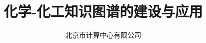 
\title{化学-化工知识图谱的建设与应用}
\author[ ]{北京市计算中心有限公司}   %
\renewcommand*{\Authfont}{\small\rm} %
\renewcommand*{\Affilfont}{\small\it} %
\renewcommand\Authands{ and } %
\renewcommand\Authands{ , } %
\date{} %


\maketitle
